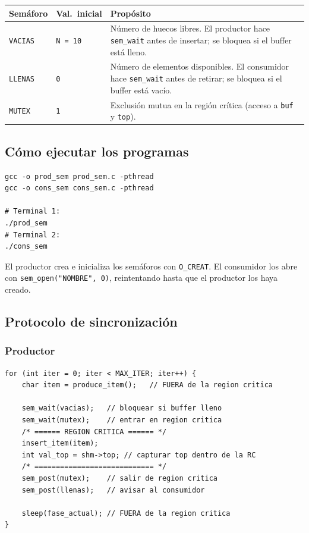 \documentclass[a4paper, 12pt]{article}
\newcommand{\ic}[1]{\texttt{#1}}
\begin{document}
\vspace{0.5em}
\begin{center}
\begin{tabular}{L{2.4cm} C{2.2cm} L{8.5cm}}
  \toprule
  \color{white}\textbf{Semáforo} &
  \color{white}\textbf{Val.\ inicial} &
  \color{white}\textbf{Propósito} \\
  \midrule
  \ic{VACIAS}  & \ic{N = 10} &
    Número de huecos libres. El productor hace \ic{sem\_wait} antes
    de insertar; se bloquea si el buffer está lleno. \\
  \addlinespace
  \ic{LLENAS}  & \ic{0} &
    Número de elementos disponibles. El consumidor hace \ic{sem\_wait}
    antes de retirar; se bloquea si el buffer está vacío. \\
  \addlinespace
  \ic{MUTEX}   & \ic{1} &
    Exclusión mutua en la región crítica (acceso a \ic{buf} y
    \ic{top}). \\
  \bottomrule
\end{tabular}
\end{center}

\subsection{Cómo ejecutar los programas}

\begin{lstlisting}[style=shellstyle]
gcc -o prod_sem prod_sem.c -pthread
gcc -o cons_sem cons_sem.c -pthread

# Terminal 1:
./prod_sem
# Terminal 2:
./cons_sem
\end{lstlisting}

El productor crea e inicializa los semáforos con \ic{O\_CREAT}.
El consumidor los abre con \ic{sem\_open("NOMBRE", 0)},
reintentando hasta que el productor los haya creado.

\subsection{Protocolo de sincronización}

\subsubsection*{Productor}

\begin{lstlisting}[style=cstyle,
  caption={Esquema del bucle del productor (\texttt{prod\_sem.c})}]
for (int iter = 0; iter < MAX_ITER; iter++) {
    char item = produce_item();   // FUERA de la region critica

    sem_wait(vacias);   // bloquear si buffer lleno
    sem_wait(mutex);    // entrar en region critica
    /* ====== REGION CRITICA ====== */
    insert_item(item);
    int val_top = shm->top; // capturar top dentro de la RC
    /* ============================ */
    sem_post(mutex);    // salir de region critica
    sem_post(llenas);   // avisar al consumidor

    sleep(fase_actual); // FUERA de la region critica
}
\end{lstlisting}
\end{document}

